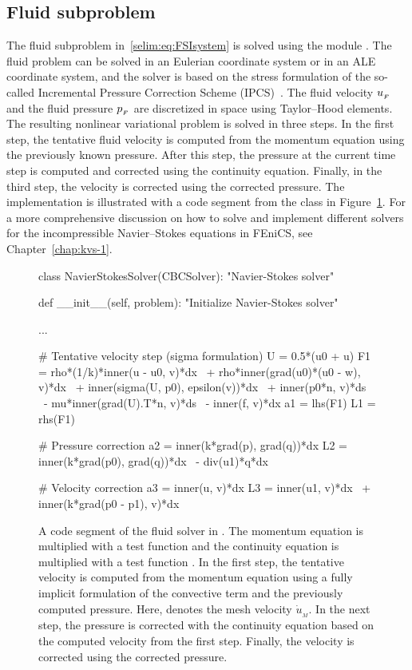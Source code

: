\subsection{Fluid subproblem}

The fluid subproblem in~\eqref{selim:eq:FSIsystem} is solved using the
 module . The fluid problem can be
solved in an Eulerian coordinate system or in an ALE coordinate
system, and the solver is based on the stress formulation of the
so-called Incremental Pressure Correction Scheme
(IPCS)~\citep{Goda1979}. The fluid velocity $u_{_{F}}$ and the fluid
pressure $p_{_{F}}$ are discretized in space using Taylor--Hood
elements. The resulting nonlinear variational problem is solved in
three steps. In the first step, the tentative fluid velocity is
computed from the momentum equation using the previously known
pressure. After this step, the pressure at the current time step is
computed and corrected using the continuity equation. Finally, in the
third step, the velocity is corrected using the corrected pressure.
The implementation is illustrated with a code segment from the class
 in Figure~\ref{selim:fig:fluidsolver}. For a
more comprehensive discussion on how to solve and implement different
solvers for the incompressible Navier--Stokes equations in FEniCS, see
Chapter~\ref{chap:kvs-1}.
\begin{figure}
\begin{python}
class NavierStokesSolver(CBCSolver):
    "Navier-Stokes solver"

    def __init__(self, problem):
        "Initialize Navier-Stokes solver"

        ...

        # Tentative velocity step (sigma formulation)
        U = 0.5*(u0 + u)
        F1 = rho*(1/k)*inner(u - u0, v)*dx \
           + rho*inner(grad(u0)*(u0 - w), v)*dx \
           + inner(sigma(U, p0), epsilon(v))*dx \
           + inner(p0*n, v)*ds \
           - mu*inner(grad(U).T*n, v)*ds \
           - inner(f, v)*dx
        a1 = lhs(F1)
        L1 = rhs(F1)

        # Pressure correction
        a2 = inner(k*grad(p), grad(q))*dx
        L2 = inner(k*grad(p0), grad(q))*dx \
           - div(u1)*q*dx

        # Velocity correction
        a3 = inner(u, v)*dx
        L3 = inner(u1, v)*dx \
           + inner(k*grad(p0 - p1), v)*dx
\end{python}
\caption{A code segment of the fluid solver in . The
  momentum equation is multiplied with a test function  and
  the continuity equation is multiplied with a test function
  \emp{q}. In the first step, the tentative velocity is computed
  from the momentum equation using a fully implicit formulation of the
  convective term and the previously computed pressure. Here, 
  denotes the mesh velocity $\dot{u}_{_{M}}$. In the next step, the
  pressure is corrected with the continuity equation based on the
  computed velocity \emp{u1} from the first step. Finally, the
  velocity is corrected using the corrected pressure.}
\label{selim:fig:fluidsolver}
\end{figure}

